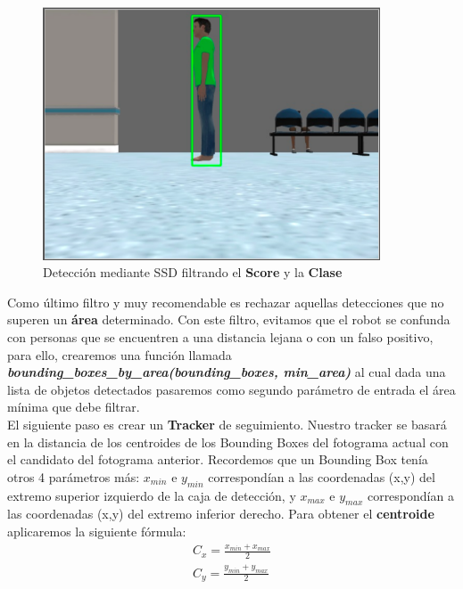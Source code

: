 \begin{figure} [H]
  \begin{center}
    \includegraphics[width=10cm]{imagenes/deteccion-ssd-filtro-score-class.png}
  \end{center}
  \caption[Detección mediante SSD filtrando el \textbf{Score} y la \textbf{Clase}]{Detección mediante SSD filtrando el \textbf{Score} y la \textbf{Clase}}
  \label{fig:deteccion_ssd_filtro_score_class}
\end{figure}

Como último filtro y muy recomendable es rechazar aquellas detecciones que no superen un \textbf{área} determinado. Con este filtro, evitamos que el robot se confunda con personas que se encuentren a una distancia lejana o con un falso positivo, para ello, crearemos una función llamada \textbf{\textit{bounding\_boxes\_by\_area(bounding\_boxes, min\_area)}} al cual dada una lista de objetos detectados pasaremos como segundo parámetro de entrada el área mínima que debe filtrar.\\

El siguiente paso es crear un \textbf{Tracker} de seguimiento. Nuestro tracker se basará en la distancia de los centroides de los Bounding Boxes del fotograma actual con el candidato del fotograma anterior. Recordemos que un Bounding Box tenía otros 4 parámetros más: $x_{min}$ e $y_{min}$ correspondían a las coordenadas (x,y) del extremo superior izquierdo de la caja de detección, y $x_{max}$ e $y_{max}$ correspondían a las coordenadas (x,y) del extremo inferior derecho. Para obtener el \textbf{centroide} aplicaremos la siguiente fórmula:\\
\begin{eqnarray*}
C_x = \frac{x_{min} + x_{max}}{2}\\
C_y = \frac{y_{min} + y_{max}}{2}\\
\end{eqnarray*}

